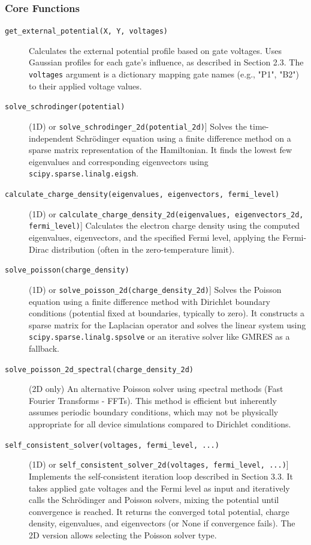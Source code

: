 \documentclass{article}
\begin{document}
\subsubsection{Core Functions}
\begin{description}
	\item[\texttt{get\_external\_potential(X, Y, voltages)}] Calculates the external potential profile based on gate voltages. Uses Gaussian profiles for each gate's influence, as described in Section 2.3. The \texttt{voltages} argument is a dictionary mapping gate names (e.g., "P1", "B2") to their applied voltage values.
	\item[\texttt{solve\_schrodinger(potential)}] (1D) or \texttt{solve\_schrodinger\_2d(potential\_2d)}] Solves the time-independent Schrödinger equation using a finite difference method on a sparse matrix representation of the Hamiltonian. It finds the lowest few eigenvalues and corresponding eigenvectors using \texttt{scipy.sparse.linalg.eigsh}.
	\item[\texttt{calculate\_charge\_density(eigenvalues, eigenvectors, fermi\_level)}] (1D) or \texttt{calculate\_charge\_density\_2d(eigenvalues, eigenvectors\_2d, fermi\_level)}] Calculates the electron charge density using the computed eigenvalues, eigenvectors, and the specified Fermi level, applying the Fermi-Dirac distribution (often in the zero-temperature limit).
	\item[\texttt{solve\_poisson(charge\_density)}] (1D) or \texttt{solve\_poisson\_2d(charge\_density\_2d)}] Solves the Poisson equation using a finite difference method with Dirichlet boundary conditions (potential fixed at boundaries, typically to zero). It constructs a sparse matrix for the Laplacian operator and solves the linear system using \texttt{scipy.sparse.linalg.spsolve} or an iterative solver like GMRES as a fallback.
	\item[\texttt{solve\_poisson\_2d\_spectral(charge\_density\_2d)}] (2D only) An alternative Poisson solver using spectral methods (Fast Fourier Transforms - FFTs). This method is efficient but inherently assumes periodic boundary conditions, which may not be physically appropriate for all device simulations compared to Dirichlet conditions.
	\item[\texttt{self\_consistent\_solver(voltages, fermi\_level, ...)}] (1D) or \texttt{self\_consistent\_solver\_2d(voltages, fermi\_level, ...)}] Implements the self-consistent iteration loop described in Section 3.3. It takes applied gate voltages and the Fermi level as input and iteratively calls the Schrödinger and Poisson solvers, mixing the potential until convergence is reached. It returns the converged total potential, charge density, eigenvalues, and eigenvectors (or None if convergence fails). The 2D version allows selecting the Poisson solver type.
\end{description}
\end{document}
